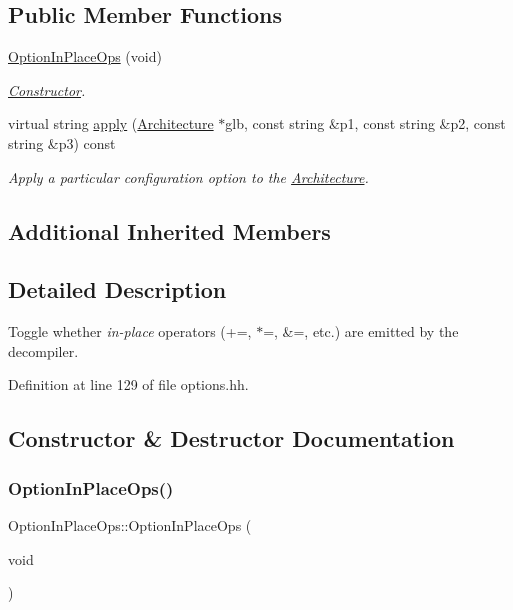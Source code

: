 \subsection*{Public Member Functions}
\begin{DoxyCompactItemize}
\item 
\mbox{\hyperlink{class_option_in_place_ops_a5a4c0d31cbb4518ebad0d9d9fd85168c}{Option\+In\+Place\+Ops}} (void)
\begin{DoxyCompactList}\small\item\em \mbox{\hyperlink{class_constructor}{Constructor}}. \end{DoxyCompactList}\item 
virtual string \mbox{\hyperlink{class_option_in_place_ops_aef329cdeae9d51c6059ef7ca9233662f}{apply}} (\mbox{\hyperlink{class_architecture}{Architecture}} $\ast$glb, const string \&p1, const string \&p2, const string \&p3) const
\begin{DoxyCompactList}\small\item\em Apply a particular configuration option to the \mbox{\hyperlink{class_architecture}{Architecture}}. \end{DoxyCompactList}\end{DoxyCompactItemize}
\subsection*{Additional Inherited Members}


\subsection{Detailed Description}
Toggle whether {\itshape in-\/place} operators (+=, $\ast$=, \&=, etc.) are emitted by the decompiler. 

Definition at line 129 of file options.\+hh.



\subsection{Constructor \& Destructor Documentation}
\mbox{\label{class_option_in_place_ops_a5a4c0d31cbb4518ebad0d9d9fd85168c}} 
\subsubsection{\texorpdfstring{OptionInPlaceOps()}{OptionInPlaceOps()}}
{\footnotesize\ttfamily Option\+In\+Place\+Ops\+::\+Option\+In\+Place\+Ops (\begin{DoxyParamCaption}\item[{void}]{ }\end{DoxyParamCaption})\hspace{0.3cm}{\ttfamily [inline]}}



